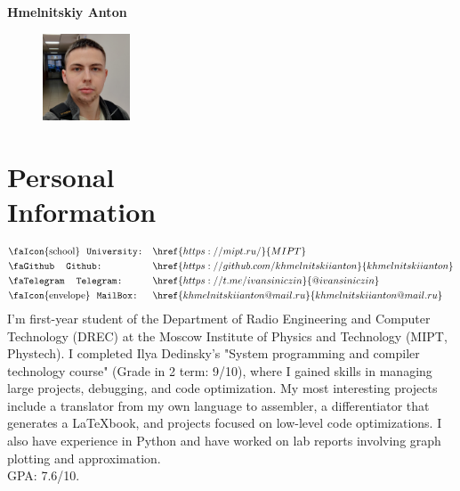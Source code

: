 \documentclass[margin,line]{resume}
\begin{document}
{\LARGE \textbf{Hmelnitskiy Anton}}
\begin{resume}


    \vspace{0.5cm}
    \begin{figure}
         \vspace{-1.3cm}
        \begin{center}
        \includegraphics[width=0.23\textwidth]{Foto.jpg}
        \end{center}
         \vspace{-1cm}
    \end{figure}

 
    \section{\mysidestyle Personal\\Information}
    \noindent
    \begin{align*}
    &\text{\faIcon{school} \space}     \texttt{University:}         && \href{https://mipt.ru/}{MIPT} \\
    &\text{\faGithub \space}         \texttt{ Github:}         && \href{https://github.com/khmelnitskiianton}{khmelnitskiianton} \\ 
    &\text{\faTelegram \space}        \texttt{ Telegram:}    && \href{https://t.me/ivansiniczin}{@ivansiniczin} \\
    &\text{\faIcon{envelope} \space}  \texttt{MailBox:} && \href{khmelnitskiianton@mail.ru}{khmelnitskiianton@mail.ru} 
    \end{align*}
     I'm first-year student of the Department of Radio Engineering and Computer Technology (DREC) at the Moscow Institute of Physics and Technology (MIPT, Phystech). I completed Ilya Dedinsky's "System programming and compiler technology course" (Grade in 2 term: 9/10), where I gained skills in managing large projects, debugging, and code optimization. My most interesting projects include a translator from my own language to assembler, a differentiator that generates a \LaTeX \space book, and projects focused on low-level code optimizations. I also have experience in Python and have worked on lab reports involving graph plotting and approximation.\\
     GPA: 7.6/10.

\end{resume}
\end{document}
